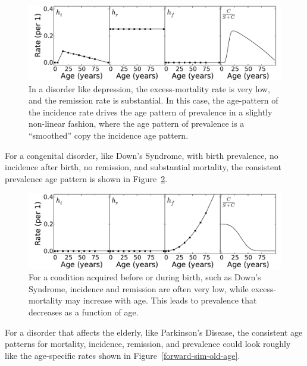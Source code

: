 \begin{figure}
\begin{center}
\includegraphics[width=\textwidth]{forward-sim-mental.pdf}
\caption{ In a disorder like depression, the excess-mortality rate is
  very low, and the remission rate is substantial.  In this case, the
  age-pattern of the incidence rate drives the age pattern of
  prevalence in a slightly non-linear fashion, where the age pattern
  of prevalence is a ``smoothed'' copy the incidence age pattern.  }
\label{forward-sim_mental}
\end{center}
\end{figure}

For a congenital disorder, like Down's Syndrome, with birth
prevalence, no incidence after birth, no remission, and substantial
mortality, the consistent prevalence age pattern is shown in
Figure~\ref{forward-sim-congenital}.

\begin{figure}[h]
\begin{center}
\includegraphics[width=\textwidth]{forward-sim-congenital.pdf}
\caption{For a condition acquired before or during birth, such as
  Down's Syndrome, incidence and remission are often very low, while
  excess-mortality may increase with age.  This leads to prevalence
  that decreases as a function of age.}
\label{forward-sim-congenital}
\end{center}
\end{figure}

For a disorder that affects the elderly, like Parkinson's Disease, the
consistent age patterns for mortality, incidence, remission, and
prevalence could look roughly like the age-specific rates shown in
Figure~\ref{forward-sim-old-age}.

